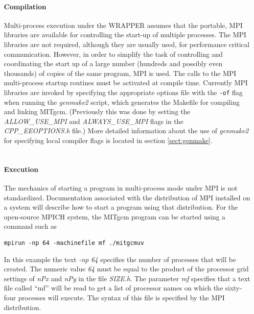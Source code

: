 \paragraph{Compilation} Multi-process execution under the WRAPPER
assumes that the portable, MPI libraries are available for controlling
the start-up of multiple processes. The MPI libraries are not
required, although they are usually used, for performance critical
communication. However, in order to simplify the task of controlling
and coordinating the start up of a large number (hundreds and possibly
even thousands) of copies of the same program, MPI is used. The calls
to the MPI multi-process startup routines must be activated at compile
time.  Currently MPI libraries are invoked by specifying the
appropriate options file with the {\tt-of} flag when running the {\em
  genmake2} script, which generates the Makefile for compiling and
linking MITgcm.  (Previously this was done by setting the {\em
  ALLOW\_USE\_MPI} and {\em ALWAYS\_USE\_MPI} flags in the {\em
  CPP\_EEOPTIONS.h} file.)  More detailed information about the use of
{\em genmake2} for specifying
local compiler flags is located in section \ref{sect:genmake}.\\


 \\
\paragraph{\bf Execution} The mechanics of starting a program in
multi-process mode under MPI is not standardized. Documentation
associated with the distribution of MPI installed on a system will
describe how to start a program using that distribution.  For the
open-source MPICH system, the MITgcm program can be started using a
command such as
\begin{verbatim}
mpirun -np 64 -machinefile mf ./mitgcmuv
\end{verbatim}
In this example the text {\em -np 64} specifies the number of
processes that will be created. The numeric value {\em 64} must be
equal to the product of the processor grid settings of {\em nPx} and
{\em nPy} in the file {\em SIZE.h}. The parameter {\em mf} specifies
that a text file called ``mf'' will be read to get a list of processor
names on which the sixty-four processes will execute. The syntax of
this file is specified by the MPI distribution.
\\

